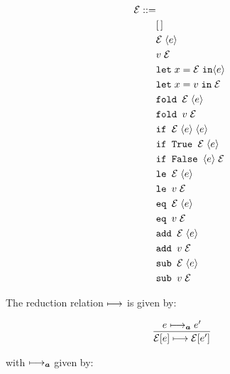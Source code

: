 \documentclass[10pt]{article}
\begin{document}
\begin{align*}
  \mathcal{E} ::=\\
    &[\,]\\
    &\mathcal{E}\; \langle e \rangle\\
    &v\; \mathcal{E}\\
    &\texttt{let}\; x = \mathcal{E}\; \texttt{in} \langle e \rangle\\
    &\texttt{let}\; x = v\; \texttt{in}\; \mathcal{E}\\
    &\texttt{fold } \mathcal{E}\; \langle e \rangle\\
    &\texttt{fold } v\; \mathcal{E}\\
    &\texttt{if } \mathcal{E}\; \langle e \rangle\; \langle e \rangle\\
    &\texttt{if True } \mathcal{E}\; \langle e \rangle\\
    &\texttt{if False } \langle e \rangle\; \mathcal{E}\\
    &\texttt{le } \mathcal{E}\; \langle e \rangle\\
    &\texttt{le } v\; \mathcal{E}\\
    &\texttt{eq } \mathcal{E}\; \langle e \rangle\\
    &\texttt{eq } v\; \mathcal{E}\\
    &\texttt{add } \mathcal{E}\; \langle e \rangle\\
    &\texttt{add } v\; \mathcal{E}\\
    &\texttt{sub } \mathcal{E}\; \langle e \rangle\\
    &\texttt{sub } v\; \mathcal{E}\\
\end{align*}

The reduction relation $\longmapsto$ is given by:

\[
  \begin{array}{c}
    \labinfer{\mathcal{E}[e] \reduces \mathcal{E}[e']}{e \reducesA e'}
  \end{array}
\]

with $\longmapsto_{\boldsymbol{a}}$ given by:
\end{document}
